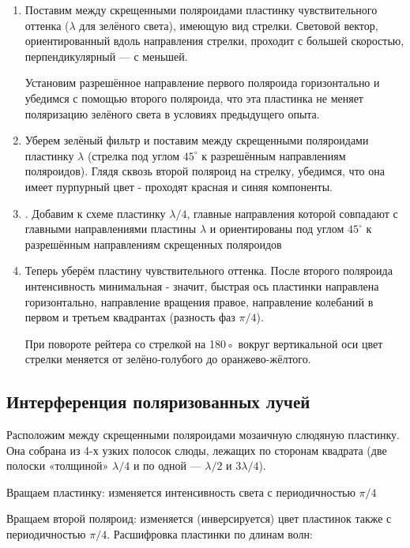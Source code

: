\begin{enumerate}
    \item Поставим между скрещенными поляроидами пластинку чувствительного оттенка ($\lambda$ для зелёного света), имеющую вид стрелки. Световой вектор, ориентированный вдоль направления стрелки, проходит с большей скоростью, перпендикулярный — с меньшей. \par
Установим разрешённое направление первого поляроида горизонтально и убедимся с помощью второго поляроида, что эта пластинка
не меняет поляризацию зелёного света в условиях предыдущего опыта.
\begin{figure}[h!]
\end{figure}
\item Уберем зелёный фильтр
и поставим между скрещенными поляроидами
пластинку $\lambda$ (стрелка под углом $45^{\circ}$ к разрешённым направлениям поляроидов).
Глядя сквозь второй поляроид на стрелку, убедимся, что она имеет пурпурный цвет - проходят красная и синяя компоненты.
\item . Добавим
к схеме пластинку $\lambda/4$, главные направления
которой совпадают с главными направлениями пластины $\lambda$ и ориентированы под
углом $45^{\circ}$ к разрешённым направлениям скрещенных поляроидов

\item Теперь уберём пластину чувствительного оттенка. После второго поляроида интенсивность минимальная - значит, быстрая ось пластинки направлена горизонтально, направление вращения правое, направление колебаний в первом и третьем квадрантах (разность фаз $\pi/4$). \par
При повороте рейтера со стрелкой на 180◦ вокруг вертикальной оси
цвет стрелки меняется от зелёно-голубого до оранжево-жёлтого.

\end{enumerate}


\subsection{Интерференция поляризованных лучей}

Расположим между скрещенными поляроидами мозаичную слюдяную пластинку. Она собрана из 4-х узких полосок слюды, лежащих по сторонам квадрата (две полоски «толщиной» $\lambda/4$ и по одной — $\lambda/2$ и $3\lambda/4$).
\par Вращаем пластинку: изменяется интенсивность света с периодичностью $\pi/4$
\par Вращаем второй поляроид: изменяется (инверсируется) цвет пластинок также с периодичностью  $\pi/4$. Расшифровка пластинки по длинам волн:

